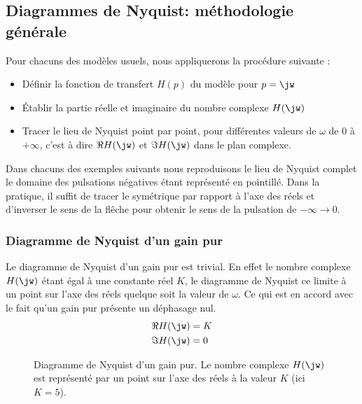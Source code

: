 \subsection{Diagrammes de Nyquist: méthodologie générale}
Pour chacuns des modèles usuels, nous appliquerons la procédure suivante :
\begin{itemize}
    \item Définir la fonction de transfert $H(p)$ du modèle pour $p=\jw$
    \item \'Etablir la partie réelle et imaginaire du nombre complexe $H(\jw)$
    \item Tracer le lieu de Nyquist point par point, pour différentes valeurs de
        $\omega$ de 0 à $+\infty$, c'est à dire $\Re{H(\jw)}$ 
          et $\Im{H(\jw)}$ dans le plan complexe.
\end{itemize}
Dans chacuns des exemples suivants nous reproduisons le lieu de Nyquist 
complet le domaine des pulsations négatives étant représenté en pointillé. 
Dans la pratique, il suffit de tracer le symétrique par rapport à 
l'axe des réels et d'inverser le sens de la flêche pour obtenir le sens de la 
pulsation de $-\infty\to 0$. 
\newpage
\subsubsection{Diagramme de Nyquist d'un gain pur}
Le diagramme de Nyquist d'un gain pur est trivial. En effet le nombre complexe 
$H(\jw)$ étant égal à une constante réel $K$, le diagramme de Nyquist ce 
limite à un point sur l'axe des réels quelque soit la valeur de $\omega$.
Ce qui est en accord avec le fait qu'un gain pur présente un déphasage nul.
\begin{align*}
    \Re{H(\jw)}&=K\\
    \Im{H(\jw)}&=0\\
\end{align*}
\begin{figure}[!h]
    \centering
    
    \caption{Diagramme de Nyquist d'un gain pur. Le nombre complexe $H(\jw)$ 
             est représenté par un point sur l'axe des réels à la valeur $K$ 
             (ici $K=5$). \label{fig-nyquist_1}}
\end{figure}
\newpage
